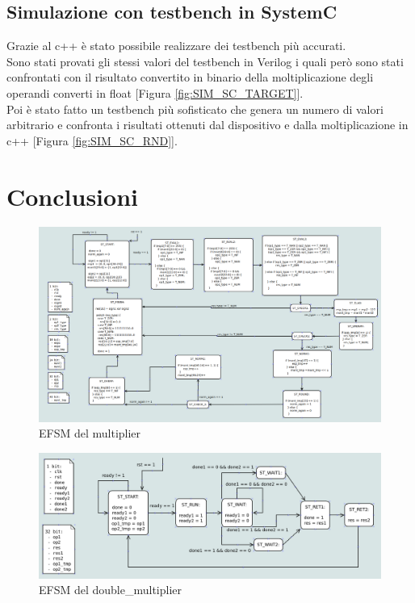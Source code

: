 \documentclass[]{IEEEtran}
\begin{document}
\subsection{Simulazione con testbench in SystemC}
Grazie al c++ è stato possibile realizzare dei testbench più accurati. 
\\Sono stati provati gli stessi valori del testbench in Verilog i quali però sono stati confrontati con il risultato convertito in binario della moltiplicazione degli operandi converti in float [Figura \ref{fig:SIM_SC_TARGET}].
\\Poi è stato fatto un testbench più sofisticato che genera un numero di valori arbitrario e confronta i risultati ottenuti dal dispositivo e dalla moltiplicazione in c++ [Figura \ref{fig:SIM_SC_RND}].














\section{Conclusioni}




\appendix

\begin{figure}[bt]
    \centering
    \includegraphics[width=\textwidth]{figures/EFSM_mult}
    \caption{EFSM del multiplier}
    \label{fig:EFSM_MULT}
\end{figure}

\begin{figure}[bt]
    \centering
    \includegraphics[width=\textwidth]{figures/EFSM_dm}
    \caption{EFSM del double\_multiplier}
    \label{fig:EFSM_DM}
\end{figure}
\end{document}
